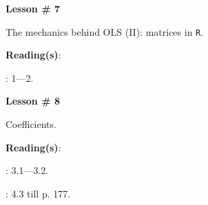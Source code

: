 \documentclass[letterpaper]{article}
\renewenvironment{itemize}{
  \begin{list}{}{
    \setlength{\leftmargin}{1.5em}
  }
}{
  \end{list}
}
\begin{document}
\begin{enumerate}

			\begin{itemize} 
				\item[$\bullet$] {\bf Lesson \# 7} %
					\begin{itemize} 
						\item[$\circ$] The mechanics behind OLS (II): matrices in \texttt{R}.
            \item[$\circ$] {\bf Reading(s)}: 
            \begin{itemize}
              \item[$\diamond$] \textcite{Namboodiri1984}: 1---2.
            \end{itemize}
					\end{itemize}
			\end{itemize}



			\begin{itemize} 
				\item[$\bullet$] {\bf Lesson \# 8} %
					\begin{itemize} 
						\item[$\circ$] Coefficients. %
						\item[$\circ$] {\bf Reading(s)}: 
							\begin{itemize}
								\item[$\diamond$] \textcite{Wooldridge2002}: 3.1---3.2.
                \item[$\diamond$] \textcite{Fox:2010vc}: 4.3 till p. 177.
							\end{itemize}
					\end{itemize}
			\end{itemize}




\end{enumerate}
\end{document}
